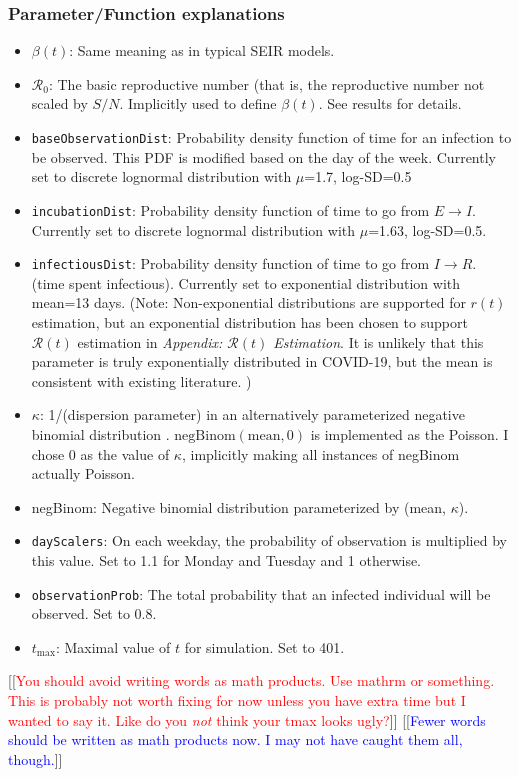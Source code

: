 \documentclass{article}
\newcommand{\nR}{\mathcal{R}}
\newcommand{\code}[1]{\texttt{#1}}
\newcommand{\jd}[1]{[[\textcolor{red}{#1}]]}  \newcommand{\msComment}[1]{[[\textcolor{blue}{#1}]]}
\newcommand{\jd}[1]{} \newcommand{\msComment}[1]{}
\begin{document}
\subsubsection{Parameter/Function explanations}
\begin{itemize}
    \item $\beta(t)$: Same meaning as in typical SEIR models. 
    \item $\nR_0$: The basic reproductive number (that is, the reproductive number not scaled by $S/N$. Implicitly used to define $\beta(t)$. See results for details.
    \item \code{baseObservationDist}: Probability density function of time for an infection to be observed. This PDF is modified based on the day of the week. Currently set to discrete lognormal distribution with $\mu$=1.7, log-SD=0.5 
    \item \code{incubationDist}: Probability density function of time to go from $E \rightarrow I$. Currently set to discrete lognormal distribution with $\mu$=1.63, log-SD=0.5. \cite{McAloon}
    \item \code{infectiousDist}: Probability density function of time to go from $I \rightarrow R$. (time spent infectious). Currently set to exponential distribution with mean=13 days. (Note: Non-exponential distributions are supported for $r(t)$ estimation, but an exponential distribution has been chosen to support $\nR(t)$ estimation in \emph{Appendix: $\nR(t)$ Estimation}. It is unlikely that this parameter is truly exponentially distributed in COVID-19, but the mean is consistent with existing literature. \cite{infectiousperiod})
    \item $\kappa$: 1/(dispersion parameter) in an alternatively parameterized negative binomial distribution \cite{NegBinom}. $\mathrm{negBinom}(\mathrm{mean}, 0)$ is implemented as the Poisson. I chose 0 as the value of $\kappa$, implicitly making all instances of negBinom actually Poisson.
    \item negBinom: Negative binomial distribution parameterized by (mean, $\kappa$). 
    \item \code{dayScalers}: On each weekday, the probability of observation is multiplied by this value. Set to 1.1 for Monday and Tuesday and 1 otherwise. 
    \item \code{observationProb}: The total probability that an infected individual will be observed. Set to 0.8.
    \item $t_{\mathrm{max}}$: Maximal value of $t$ for simulation. Set to 401.
\end{itemize}
\jd{You should avoid writing words as math products. Use mathrm or something. This is probably not worth fixing for now unless you have extra time but I wanted to say it. Like do you \emph{not} think your tmax looks ugly?} \msComment{Fewer words should be written as math products now. I may not have caught them all, though.}
\end{document}
